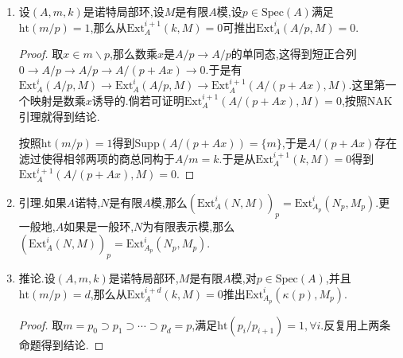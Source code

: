 \begin{enumerate}
\begin{proof}
		先证第一个等式.对$n=-1$的情况,此即$\mathrm{Hom}_A(N,M)=0$.任取模同态$f:N\to M$,那么$f(n)=0$等价于$xf(n)=0$等价于$f(xn)=0$,这总成立,于是$f$总是零同态.对$n$的一般情况见讲义,用到泛同调函子.
		
		证明第二个等式.取$M$的自由预解$L_*\to M$.记$L_n'=L_n/xL_n$.考虑复形的短正合列$0\to(L_*,M)\to(L_*,M)\to(L'_*,M')\to0$,这可得到$L'_*\to M'$是$M'$的自由预解.于是$H^n(\mathrm{Hom}_A(L_*,N))=H^n(\mathrm{Hom}_{A'}(L'_*,N))$.取同调得到结果.第三个等式是类似的.
	\end{proof}
	\item 设$(A,m,k)$是诺特局部环,设$M$是有限$A$模,设$p\in\mathrm{Spec}(A)$满足$\mathrm{ht}(m/p)=1$,那么从$\mathrm{Ext}^{i+1}_A(k,M)=0$可推出$\mathrm{Ext}_A^i(A/p,M)=0$.
	\begin{proof}
		
		取$x\in m\backslash p$,那么数乘$x$是$A/p\to A/p$的单同态,这得到短正合列$0\to A/p\to A/p\to A/(p+Ax)\to0$.于是有$\mathrm{Ext}_A^i(A/p,M)\to\mathrm{Ext}_A^i(A/p,M)\to\mathrm{Ext}_A^{i+1}(A/(p+Ax),M)$.这里第一个映射是数乘$x$诱导的.倘若可证明$\mathrm{Ext}^{i+1}_A(A/(p+Ax),M)=0$,按照NAK引理就得到结论.
		
		按照$\mathrm{ht}(m/p)=1$得到$\mathrm{Supp}(A/(p+Ax))=\{m\}$,于是$A/(p+Ax)$存在滤过使得相邻两项的商总同构于$A/m=k$.于是从$\mathrm{Ext}_A^{i+1}(k,M)=0$得到$\mathrm{Ext}_A^{i+1}(A/(p+Ax),M)=0$.
	\end{proof}
	\item 引理.如果$A$诺特,$N$是有限$A$模,那么$(\mathrm{Ext}_A^i(N,M))_p=\mathrm{Ext}_{A_p}^i(N_p,M_p)$.更一般地,$A$如果是一般环,$N$为有限表示模,那么$(\mathrm{Ext}_A^i(N,M))_p=\mathrm{Ext}_{A_p}^i(N_p,M_p)$.
	\item 推论.设$(A,m,k)$是诺特局部环,$M$是有限$A$模,对$p\in\mathrm{Spec}(A)$,并且$\mathrm{ht}(m/p)=d$,那么从$\mathrm{Ext}_A^{i+d}(k,M)=0$推出$\mathrm{Ext}_{A_p}^i(\kappa(p),M_p)$.
	\begin{proof}
		
		取$m=p_0\supset p_1\supset\cdots\supset p_d=p$,满足$\mathrm{ht}(p_i/p_{i+1})=1,\forall i$.反复用上两条命题得到结论.
	\end{proof}
\end{enumerate}

